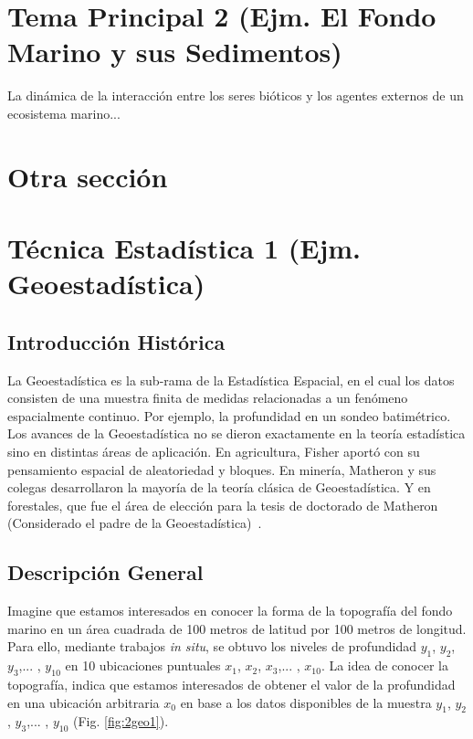 \section{Tema Principal 2 (Ejm. El Fondo Marino y sus Sedimentos)}

La dinámica de la interacción entre los seres bióticos y los agentes externos de un ecosistema marino...

\section{Otra sección}

\blindtext
\section{Técnica Estadística 1 (Ejm. Geoestadística)}

\subsection{Introducción Histórica}
La Geoestadística es la sub-rama de la Estadística Espacial, en el cual los datos consisten de una muestra finita de medidas relacionadas a un fenómeno espacialmente continuo. Por ejemplo, la profundidad en un sondeo batimétrico. Los avances de la Geoestadística no se dieron exactamente en la teoría estadística sino en distintas áreas de aplicación. En agricultura, Fisher aportó con su pensamiento espacial de aleatoriedad y bloques. En minería, Matheron y sus colegas desarrollaron la mayoría de la teoría clásica de Geoestadística. Y en forestales, que fue el área de elección para la tesis de doctorado de Matheron (Considerado el padre de la Geoestadística)~\cite{Diggle2007}.

\subsection{Descripción General}

Imagine que estamos interesados en conocer la forma de la topografía del fondo marino en un área cuadrada de 100 metros de latitud por 100 metros de longitud. Para ello, mediante trabajos \textit{in situ}, se obtuvo los niveles de profundidad $y_1$, $y_2$, $y_3$,... ,  $y_{10}$ en 10 ubicaciones puntuales $x_1$, $x_2$, $x_3$,... ,  $x_{10}$. La idea de conocer la  topografía, indica que estamos interesados de obtener el valor de la profundidad en una ubicación arbitraria $x_0$ en base a los datos disponibles de la muestra $y_1$, $y_2$, $y_3$,... ,  $y_{10}$ (Fig. \ref{fig:2geo1}).


